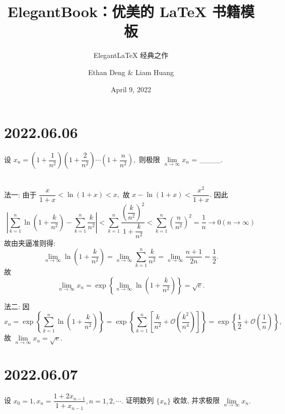 \documentclass[lang=cn,12pt]{elegantbook}
\title{ElegantBook：优美的 \LaTeX{} 书籍模板}
\subtitle{Elegant\LaTeX{} 经典之作}
\author{Ethan Deng \& Liam Huang}
\institute{Elegant\LaTeX{} Program}
\date{April 9, 2022}
\begin{document}





\section*{2022.06.06}

设 $x_{n} = \left(1+\dfrac{1}{n^2}\right)\left(1+\dfrac{2}{n^2}\right)
  \cdots \left(1+\dfrac{n}{n^2}\right),$
则极限 $\lim\limits_{n\to\infty} x_{n}$ = \_\_\_\_.
\\  \\

\begin{solution}
  法一: 由于 $\dfrac{x}{1+x}<\ln\left(1+x\right)<x,$ 故 
  $x-\ln\left(1+x\right)<\dfrac{x^2}{1+x}.$
  因此
  $$\left|\sum_{k=1}^{n}\ln \left(1+\dfrac{k}{n^2}\right) - 
  \sum_{k=1}^{n}\dfrac{k}{n^2}\right| <
  \sum_{k=1}^{n}\dfrac{\left(\dfrac{k}{n^2}\right)^2}{
    1+\dfrac{k}{n^2}}<\sum_{k=1}^{n} \left(\dfrac{n}{n^2}\right)^2 =
    \dfrac{1}{n} \to 0 (n\to\infty)
  $$
  故由夹逼准则得: $$\lim\limits_{n\to\infty} \ln \left(1+\dfrac{k}{n^2}\right) =
    \lim\limits_{n\to\infty} \sum_{k=1}^{n}\dfrac{k}{n^2} =
    \lim\limits_{n\to\infty} \dfrac{n+1}{2n} = \dfrac{1}{2}.$$
  故 $$\lim\limits_{n\to\infty} x_{n} = 
    \exp\left\{\lim\limits_{n\to\infty} \ln \left(1+\dfrac{k}{n^2}\right)\right\} =
    \sqrt{e}.$$
  \vspace{6pt}

  法二: 因
  $$
  x_{n} = \exp\left\{ \sum_{k=1}^{n} \ln \left(1+\dfrac{k}{n^2}\right)\right\} = 
  \exp\left\{ \sum_{k=1}^{n} \left[\dfrac{k}{n^2}+\mathcal{O}\left(
    \dfrac{k^2}{n^4}\right) \right] \right\} =
  \exp\left\{ \dfrac{1}{2} + \mathcal{O}\left(\dfrac{1}{n}\right) \right\},
  $$
  故 $\lim\limits_{n\to\infty} x_{n} = \sqrt{e}.$

\end{solution}

\newpage

\section*{2022.06.07}

设 $x_{0} = 1, x_{n} = \dfrac{1+2x_{n-1}}{1+x_{n-1}}, n = 1, 2, \cdots.$
证明数列 $\{x_{n}\}$ 收敛, 并求极限 $\lim\limits_{n\to\infty} x_{n}.$
\\ \\
\end{document}
